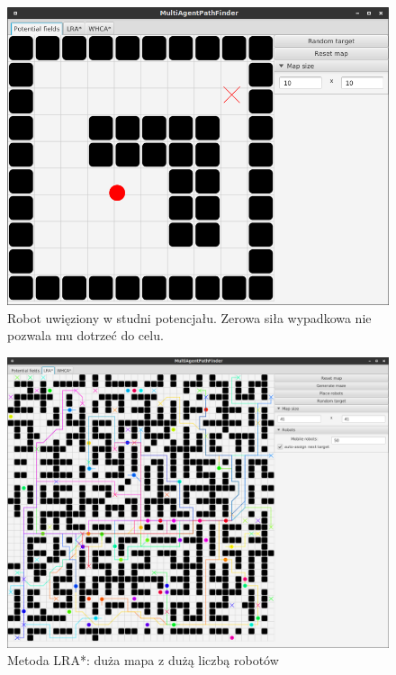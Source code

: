 \begin{figure}
	\centering
	\includegraphics[width=0.8\columnwidth]{img/robopath/field-potential-hole}
	\caption{Robot uwięziony w studni potencjału. Zerowa siła wypadkowa nie pozwala mu dotrzeć do celu.}
	\label{fig:test-field-potential-hole}
\end{figure}

\begin{figure}
	\centering
	\includegraphics[width=0.8\columnwidth]{img/robopath/lra-bigmap}
	\caption{Metoda LRA*: duża mapa z dużą liczbą robotów}
	\label{fig:test-lra-bigmap}
\end{figure}


